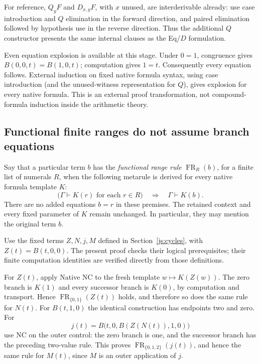 For reference, $Q_yF$ and $D_{x,y}F$, with $x$ unused, are interderivable
already: use case introduction and $Q$ elimination in the forward
direction, and paired elimination followed by hypothesis use in the
reverse direction.  Thus the additional $Q$ constructor presents the
same internal clauses as the Eq/$D$ formulation.

Even equation explosion is available at this stage.  Under $0=1$,
congruence gives $B(0,0,t)=B(1,0,t)$; computation gives $1=t$.
Consequently every equation follows.  External induction on fixed native
formula syntax, using case introduction (and the unused-witness
representation for $Q$), gives explosion for every native formula.
This is an external proof transformation, not compound-formula induction
inside the arithmetic theory.

\subsection{Functional finite ranges do not assume branch equations}

Say that a particular term $b$ has the \emph{functional range rule}
$\operatorname{FR}_R(b)$, for a finite list of numerals $R$, when the
following metarule is derived for every native formula template $K$:
\[
 \bigl(\Gamma\vdash K(r)\text{ for each }r\in R\bigr)
 \quad\Longrightarrow\quad\Gamma\vdash K(b).
 \tag{FR}\label{nb:fr}
\]
There are no added equations $b=r$ in these premises.  The retained
context and every fixed parameter of $K$ remain unchanged.  In
particular, they may mention the original term $b$.

Use the fixed terms $Z,N,j,M$ defined in
Section~\ref{js:cycles}, with $Z(t)=B(t,0,0)$. The present proof
checks their logical prerequisites; their finite computation identities
are verified directly from those definitions.

For $Z(t)$, apply Native NC to the fresh template $w\mapsto K(Z(w))$.
The zero branch is $K(1)$ and every successor branch is $K(0)$, by
computation and transport.  Hence $\operatorname{FR}_{\{0,1\}}(Z(t))$
holds, and therefore so does the same rule for $N(t)$.
For $B(t,1,0)$ the identical construction has endpoints two and zero.
For
\[
 j(t)=B\bigl(t,0,B(Z(N(t)),1,0)\bigr)
\]
use NC on the outer control: the zero branch is one, and the successor
branch has the preceding two-value rule.  This proves
$\operatorname{FR}_{\{0,1,2\}}(j(t))$, and hence the same rule for
$M(t)$, since $M$ is an outer application of $j$.

